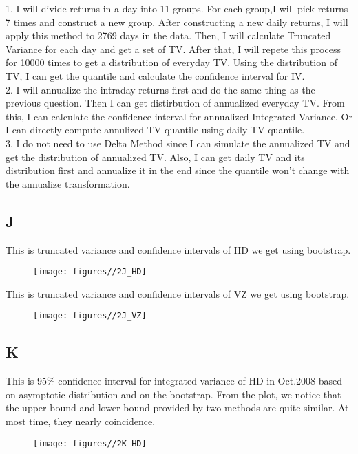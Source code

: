 \documentclass{report}
\begin{document}
1. I will divide returns in a day into 11 groups. For each group,I will pick returns 7 times and construct a new group. After constructing a new daily returns, I will apply this method to 2769 days in the data. Then, I will calculate Truncated Variance for each day and get a set of TV. After that, I will repete this process for 10000 times to get a distribution of everyday TV. Using the distribution of TV, I can get the quantile and calculate the confidence interval for IV.\\
2. I will annualize the intraday returns first and do the same thing as the previous question. Then I can get distirbution of annualized everyday TV. From this, I can calculate the confidence interval for annualized Integrated Variance. Or I can directly compute annulized TV quantile using daily TV quantile.\\
3. I do not need to use Delta Method since I can simulate the annualized TV and get the distribution of annualized TV. Also, I can get daily TV and its distribution first and annualize it in the end since the quantile won't change with the annualize transformation.

\subsection{J}

This is truncated variance and confidence intervals of HD we get using bootstrap.
\begin{figure}[H]
        \centering 
         \texttt{[image: figures//2J\_HD]}
\end{figure}

This is truncated variance and confidence intervals of VZ we get using bootstrap.
\begin{figure}[H]
        \centering 
         \texttt{[image: figures//2J\_VZ]}
\end{figure}

\subsection{K}

This is 95\% confidence interval for integrated variance of HD in Oct.2008 based on asymptotic distribution and on the bootstrap. From the plot, we notice that the upper bound and lower bound provided by two methods are quite similar. At most time, they nearly coincidence. 
\begin{figure}[H]
        \centering 
         \texttt{[image: figures//2K\_HD]}
\end{figure}
\end{document}
